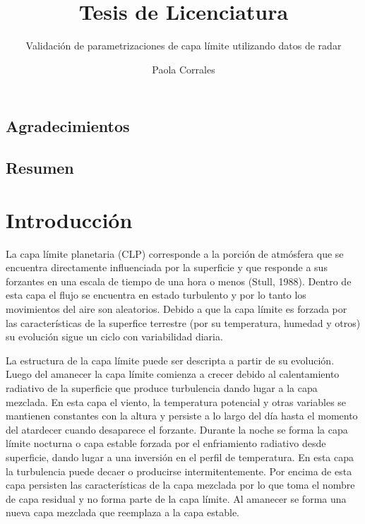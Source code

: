 \documentclass[12pt,spanish,oneside]{book}
\title{Tesis de Licenciatura}
\subtitle{Validación de parametrizaciones de capa límite utilizando datos de radar}
\author{Paola Corrales}
\date{}
\begin{document}
\maketitle

{
\setcounter{tocdepth}{3}
\tableofcontents
}
\renewcommand{\listtablename}{Índice de tablas} 
\renewcommand{\tablename}{Tabla} 

\listoffigures
\newpage

\listoftables
\newpage

\section*{Agradecimientos}\newpage

\section*{Resumen}\newpage

\chapter{Introducción}\label{introduccion}

La capa límite planetaria (CLP) corresponde a la porción de atmósfera
que se encuentra directamente influenciada por la superficie y que
responde a sus forzantes en una escala de tiempo de una hora o menos
(Stull, 1988). Dentro de esta capa el flujo se encuentra en estado
turbulento y por lo tanto los movimientos del aire son aleatorios.
Debido a que la capa límite es forzada por las características de la
superfice terrestre (por su temperatura, humedad y otros) su evolución
sigue un ciclo con variabilidad diaria.

La estructura de la capa límite puede ser descripta a partir de su
evolución. Luego del amanecer la capa límite comienza a crecer debido al
calentamiento radiativo de la superficie que produce turbulencia dando
lugar a la capa mezclada. En esta capa el viento, la temperatura
potencial y otras variables se mantienen constantes con la altura y
persiste a lo largo del día hasta el momento del atardecer cuando
desaparece el forzante. Durante la noche se forma la capa límite
nocturna o capa estable forzada por el enfriamiento radiativo desde
superficie, dando lugar a una inversión en el perfil de temperatura. En
esta capa la turbulencia puede decaer o producirse intermitentemente.
Por encima de esta capa persisten las características de la capa
mezclada por lo que toma el nombre de capa residual y no forma parte de
la capa límite. Al amanecer se forma una nueva capa mezclada que
reemplaza a la capa estable.
\end{document}
